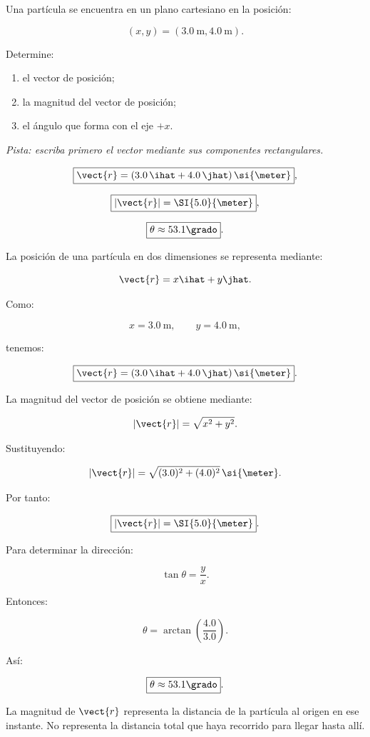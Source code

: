 ﻿\nivelbasico


\begin{ejercicio}
Una partícula se encuentra en un plano cartesiano en la posición:

\[
(x,y)=(\SI{3.0}{\meter},\SI{4.0}{\meter}).
\]

Determine:

\begin{enumerate}[label=\alph*)]
    \item el vector de posición;
    \item la magnitud del vector de posición;
    \item el ángulo que forma con el eje \(+x\).
\end{enumerate}

\textit{Pista: escriba primero el vector mediante sus componentes rectangulares.}
\end{ejercicio}

\begin{respuesta}
\[
\boxed{\vect{r}=(3.0\,\ihat+4.0\,\jhat)\,\si{\meter}},
\]

\[
\boxed{|\vect{r}|=\SI{5.0}{\meter}},
\]

\[
\boxed{\theta\approx53.1\grado}.
\]
\end{respuesta}

\begin{explicacion}
La posición de una partícula en dos dimensiones se representa mediante:

\[
\vect{r}=x\ihat+y\jhat.
\]

Como:

\[
x=\SI{3.0}{\meter},
\qquad
y=\SI{4.0}{\meter},
\]

tenemos:

\[
\boxed{
\vect{r}
=
(3.0\,\ihat+4.0\,\jhat)\,\si{\meter}
}.
\]

La magnitud del vector de posición se obtiene mediante:

\[
|\vect{r}|
=
\sqrt{x^2+y^2}.
\]

Sustituyendo:

\[
|\vect{r}|
=
\sqrt{(3.0)^2+(4.0)^2}\,\si{\meter}.
\]

Por tanto:

\[
\boxed{|\vect{r}|=\SI{5.0}{\meter}}.
\]

Para determinar la dirección:

\[
\tan\theta=\frac{y}{x}.
\]

Entonces:

\[
\theta
=
\arctan\left(\frac{4.0}{3.0}\right).
\]

Así:

\[
\boxed{\theta\approx53.1\grado}.
\]

La magnitud de \(\vect{r}\) representa la distancia de la partícula al origen en ese instante. No representa la distancia total que haya recorrido para llegar hasta allí.
\end{explicacion}


